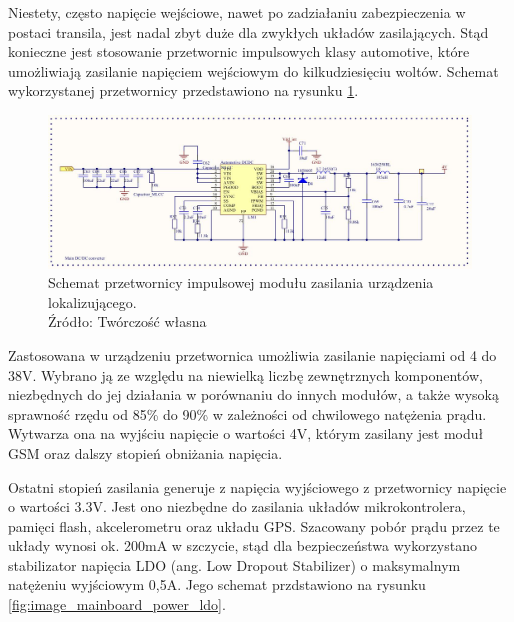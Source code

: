 Niestety, często napięcie wejściowe, nawet po zadziałaniu zabezpieczenia w postaci transila, jest nadal zbyt duże dla zwykłych układów zasilających. Stąd konieczne jest stosowanie przetwornic impulsowych klasy automotive, które umożliwiają zasilanie napięciem wejściowym do kilkudziesięciu woltów. Schemat wykorzystanej przetwornicy przedstawiono na rysunku \ref{fig:image_mainboard_power_converter}.

\begin{figure}[H]
	\centering
	\includegraphics[width=17cm]{img/schematics/mainboard_power_converter.jpg}
	\caption{Schemat przetwornicy impulsowej modułu zasilania urządzenia lokalizującego. \\ Źródło: Twórczość własna}
	\label{fig:image_mainboard_power_converter}
\end{figure}

Zastosowana w urządzeniu przetwornica umożliwia zasilanie napięciami od 4 do 38V. Wybrano ją ze względu na niewielką liczbę zewnętrznych komponentów, niezbędnych do jej działania w porównaniu do innych modułów, a także wysoką sprawność rzędu od 85\% do 90\% w zależności od chwilowego natężenia prądu. Wytwarza ona na wyjściu napięcie o wartości 4V, którym zasilany jest moduł GSM oraz dalszy stopień obniżania napięcia.

Ostatni stopień zasilania generuje z napięcia wyjściowego z przetwornicy napięcie o wartości 3.3V. Jest ono niezbędne do zasilania układów mikrokontrolera, pamięci flash, akcelerometru oraz układu GPS. Szacowany pobór prądu przez te układy wynosi ok. 200mA w szczycie, stąd dla bezpieczeństwa wykorzystano stabilizator napięcia LDO (ang. Low Dropout Stabilizer) o maksymalnym natężeniu wyjściowym 0,5A. Jego schemat przdstawiono na rysunku \ref{fig:image_mainboard_power_ldo}.


